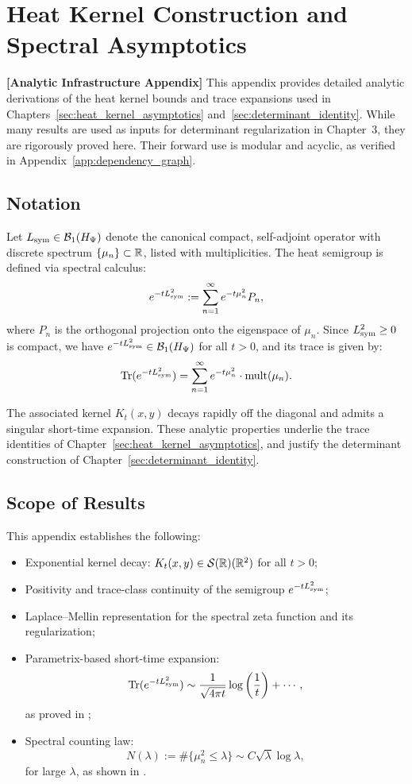\section{Heat Kernel Construction and Spectral Asymptotics}
\label{app:heat_kernel_construction}

\noindent\textbf{[Analytic Infrastructure Appendix]}  
This appendix provides detailed analytic derivations of the heat kernel bounds and trace expansions used in Chapters~\ref{sec:heat_kernel_asymptotics} and~\ref{sec:determinant_identity}. While many results are used as inputs for determinant regularization in Chapter~3, they are rigorously proved here. Their forward use is modular and acyclic, as verified in Appendix~\ref{app:dependency_graph}.

\subsection*{Notation}

Let \( L_{\mathrm{sym}} \in \mathcal{B}_1(H_{\Psi}) \) denote the canonical compact, self-adjoint operator with discrete spectrum \( \{ \mu_n \} \subset \mathbb{R} \), listed with multiplicities. The heat semigroup is defined via spectral calculus:
\[
e^{-t L_{\mathrm{sym}}^2} := \sum_{n=1}^\infty e^{-t \mu_n^2} P_n,
\]
where \( P_n \) is the orthogonal projection onto the eigenspace of \( \mu_n \). Since \( L_{\mathrm{sym}}^2 \ge 0 \) is compact, we have \( e^{-t L_{\mathrm{sym}}^2} \in \mathcal{B}_1(H_{\Psi}) \) for all \( t > 0 \), and its trace is given by:
\[
\operatorname{Tr}(e^{-t L_{\mathrm{sym}}^2}) = \sum_{n=1}^\infty e^{-t \mu_n^2} \cdot \operatorname{mult}(\mu_n).
\]

The associated kernel \( K_t(x, y) \) decays rapidly off the diagonal and admits a singular short-time expansion. These analytic properties underlie the trace identities of Chapter~\ref{sec:heat_kernel_asymptotics}, and justify the determinant construction of Chapter~\ref{sec:determinant_identity}.

\subsection*{Scope of Results}

This appendix establishes the following:

\begin{itemize}
  \item Exponential kernel decay: \( K_t(x, y) \in \mathcal{S}(\mathbb{R})(\mathbb{R}^2) \) for all \( t > 0 \);
  \item Positivity and trace-class continuity of the semigroup \( e^{-t L_{\mathrm{sym}}^2} \);
  \item Laplace–Mellin representation for the spectral zeta function and its regularization;
  \item Parametrix-based short-time expansion:
  \[
  \operatorname{Tr}(e^{-t L_{\mathrm{sym}}^2}) \sim \frac{1}{\sqrt{4\pi t}} \log\left( \frac{1}{t} \right) + \cdots,
  \]
  as proved in ;

  \item Spectral counting law:
  \[
  N(\lambda) := \#\{ \mu_n^2 \le \lambda \} \sim C \sqrt{\lambda} \log \lambda,
  \]
  for large \( \lambda \), as shown in .
\end{itemize}

